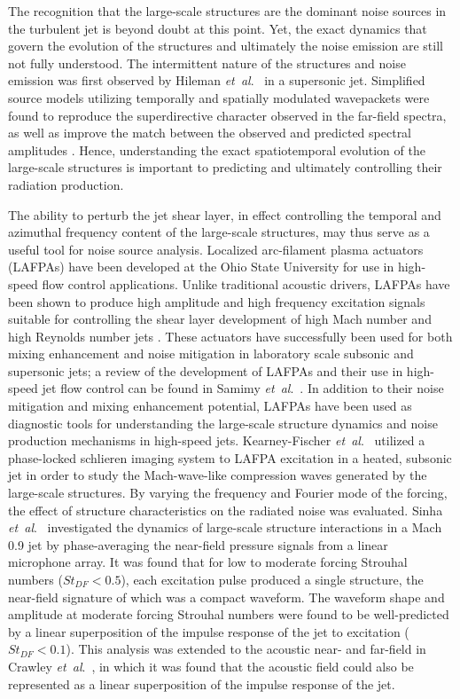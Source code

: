 \documentclass[english]{aiaa-tc}
\newcommand*{\etal}{\textit{et~al}.\ }
\begin{document}
The recognition that the large-scale structures are the dominant noise sources in the turbulent jet is beyond doubt at this point. 
Yet, the exact dynamics that govern the evolution of the structures and ultimately the noise emission are still not fully understood. 
The intermittent nature of the structures and noise emission was first observed by Hileman \etal \cite{hj2005-1} in a supersonic jet. 
Simplified source models utilizing temporally and spatially modulated wavepackets were found to reproduce the superdirective character observed in the far-field spectra, as well as improve the match between the observed and predicted spectral amplitudes \cite{Sandham2006,Cavalieri2010,Crighton1990}. 
Hence, understanding the exact spatiotemporal evolution of the large-scale structures is important to predicting and ultimately controlling their radiation production. 

The ability to perturb the jet shear layer, in effect controlling the temporal and azimuthal frequency content of the large-scale structures, may thus serve as a useful tool for noise source analysis. 
Localized arc-filament plasma actuators (LAFPAs) have been developed at the Ohio State University for use in high-speed flow control applications. 
Unlike traditional acoustic drivers, LAFPAs have been shown to produce high amplitude and high frequency excitation signals suitable for controlling the shear layer development of high Mach number and high Reynolds number jets \cite{sm2004-1,uyg2007-2,sm2007-2,sm2007-3}.
These actuators have successfully been used for both mixing enhancement and noise mitigation in laboratory scale subsonic and supersonic jets; a review of the development of LAFPAs and their use in high-speed jet flow control can be found in Samimy \etal \cite{Samimy2012}. 
In addition to their noise mitigation and mixing enhancement potential, LAFPAs have been used as diagnostic tools for understanding the large-scale structure dynamics and noise production mechanisms in high-speed jets. 
Kearney-Fischer \etal \cite{Kearney-Fischer2011a} utilized a phase-locked schlieren imaging system to LAFPA excitation in a heated, subsonic jet in order to study the Mach-wave-like compression waves generated by the large-scale structures. 
By varying the frequency and Fourier mode of the forcing, the effect of structure characteristics on the radiated noise was evaluated. 
Sinha \etal \cite{sinha2013} investigated the dynamics of large-scale structure interactions in a Mach 0.9 jet by phase-averaging the near-field pressure signals from a linear microphone array. 
It was found that for low to moderate forcing Strouhal numbers ($St_{DF}  <  0.5$), each excitation pulse produced a single structure, the near-field signature of which was a compact waveform. 
The waveform shape and amplitude at moderate forcing Strouhal numbers were found to be well-predicted by a linear superposition of the impulse response of the jet to excitation ($St_{DF}  <  0.1$). 
This analysis was extended to the acoustic near- and far-field in Crawley \etal \cite{Crawley2015}, in which it was found that the acoustic field could also be represented as a linear superposition of the impulse response of the jet.
\end{document}
